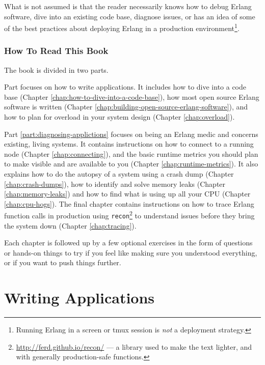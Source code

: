 \documentclass[11pt, oneside]{book}   	%
\newcommand{\otpapp}[1]{\Verb`#1`}
\begin{document}
What is not assumed is that the reader necessarily knows how to debug Erlang software, dive into an existing code base, diagnose issues, or has an idea of some of the best practices about deploying Erlang in a production environment\footnote{Running Erlang in a screen or tmux session is \emph{not} a deployment strategy.}.

\section{How To Read This Book}
\label{sec:how-to-read-this-book}

The book is divided in two parts. 

Part \ref{part:writing-applications} focuses on how to write applications. It includes how to dive into a code base (Chapter \ref{chap:how-to-dive-into-a-code-base}), how most open source Erlang software is written (Chapter \ref{chap:building-open-source-erlang-software}), and how to plan for overload in your system design (Chapter \ref{chap:overload}).

Part \ref{part:diagnosing-applictions} focuses on being an Erlang medic and concerns existing, living systems. It contains instructions on how to connect to a running node (Chapter \ref{chap:connecting}), and the basic runtime metrics you should plan to make visible and are available to you (Chapter \ref{chap:runtime-metrics}). It also explains how to do the autopsy of a system using a crash dump (Chapter \ref{chap:crash-dumps}), how to identify and solve memory leaks (Chapter \ref{chap:memory-leaks}) and how to find what is using up all your CPU (Chapter \ref{chap:cpu-hogs}). The final chapter contains instructions on how to trace Erlang function calls in production using \otpapp{recon}\footnote{\href{http://ferd.github.io/recon/}{http://ferd.github.io/recon/} — a library used to make the text lighter, and with generally production-safe functions.} to understand issues before they bring the system down (Chapter \ref{chap:tracing}).

Each chapter is followed up by a few optional exercises in the form of questions or hands-on things to try if you feel like making sure you understood everything, or if you want to push things further.

\part{Writing Applications}
\label{part:writing-applications}
\end{document}
